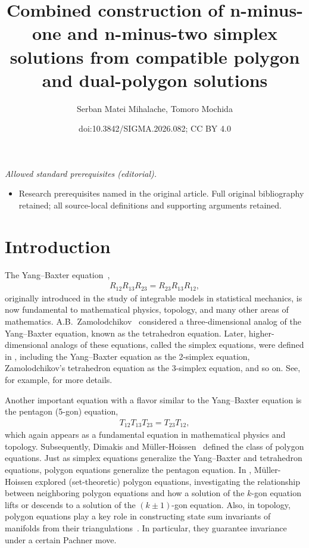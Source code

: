 \documentclass[10pt,a4paper]{amsart}
\title{Combined construction of n-minus-one and n-minus-two simplex solutions from compatible polygon and dual-polygon solutions}
\author{Serban Matei Mihalache, Tomoro Mochida}
\date{doi:10.3842/SIGMA.2026.082; CC BY 4.0}
\numberwithin{equation}{section}
\theoremstyle{definition}
\begin{document}
\maketitle
\noindent\textit{Allowed standard prerequisites (editorial).}\begin{itemize}
\item Research prerequisites named in the original article. Full original bibliography retained; all source-local definitions and supporting arguments retained.
\end{itemize}\medskip
\section{Introduction}

The Yang--Baxter equation~\cite{baxter1972partition, yang1967some},
\begin{align*}
 R_{12}R_{13}R_{23}=R_{23}R_{13}R_{12},
\end{align*}
originally introduced in the study of integrable models in statistical mechanics, is now fundamental to mathematical physics, topology, and many other areas of mathematics. A.B.~Zamolodchikov~\cite{zamolodchikov1980tetrahedra,zamolodchikov1981tetrahedron} considered a three-dimensional analog of the Yang--Baxter equation, known as the tetrahedron equation.
Later, higher-dimensional analogs of these equations, called the simplex equations, were defined in \cite{bazhanov1982conditions}, including the Yang--Baxter equation as the 2-simplex equation, Zamolodchikov's tetrahedron equation as the 3-simplex equation, and so on. See, for example, \cite{bardakov2024set, carter1996formulations,dimakis2015simplex, jimbo1989introduction,
korepanov2016cohomologies,maillet1989tetrahedron} for more details.

Another important equation with a flavor similar to the Yang--Baxter equation is the pentagon (5-gon) equation,
\begin{align*}
 T_{12}T_{13}T_{23}=T_{23}T_{12},
\end{align*}
which again appears as a fundamental equation in mathematical physics and topology. Subsequently, Dimakis and M\"uller-Hoissen~\cite{dimakis2015simplex} defined the class of polygon equations. Just as simplex equations generalize the Yang--Baxter and tetrahedron equations, polygon equations generalize the pentagon equation. In \cite{muller2024structure}, M\"uller-Hoissen explored (set-theoretic) polygon equations, investigating the relationship between neighboring polygon equations and how a solution of the $k$-gon equation lifts or descends to a solution of the $(k\pm1)$-gon equation. Also, in topology, polygon equations play a key role in constructing state sum invariants of manifolds from their triangulations~\cite{kashaev2018simple,korepanov2024odd, korepanov2017hexagon}. In particular, they guarantee invariance under a certain Pachner move.
\end{document}
